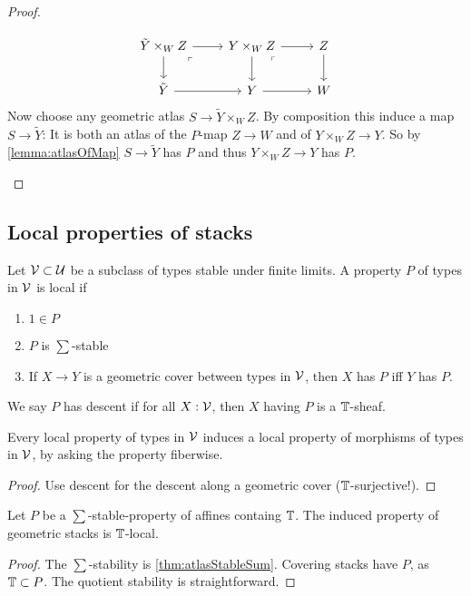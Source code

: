 \begin{proof}
\begin{enumerate}
		\[\begin{tikzcd}
			{\tilde Y \times_W Z} & {Y \times_W Z} & Z \\
			{\tilde Y} & Y & W
			\arrow[from=1-1, to=1-2]
			\arrow[from=1-1, to=2-1]
			\arrow["\ulcorner"{anchor=center, pos=0.125}, draw=none, from=1-1, to=2-2]
			\arrow[from=1-2, to=1-3]
			\arrow[from=1-2, to=2-2]
			\arrow["\ulcorner"{anchor=center, pos=0.125}, draw=none, from=1-2, to=2-3]
			\arrow[from=1-3, to=2-3]
			\arrow[from=2-1, to=2-2]
			\arrow[from=2-2, to=2-3]
		\end{tikzcd}\]
		Now choose any geometric atlas $S \to \tilde Y \times_W Z$. By composition this induce a map $S \to \tilde Y$: 
		It is both an atlas of the $P$-map $Z \to W$ and of $ Y\times_W Z \to Y$. So by \ref{lemma:atlasOfMap} $S \to \tilde Y$ has $P$ and thus $Y \times_W Z \to Y$ has $P$. 
		
	\end{enumerate}
\end{proof}
\subsection{Local properties of stacks}
\begin{definition}
	Let $\mathcal{V} \subset \mathcal{U}$ be a subclass of types stable under finite limits. A property $P$ of types in $\mathcal{V}$ is local if 
	\begin{enumerate}
		\item $1 \in P$
		\item $P$ is $\sum$-stable
		\item If $X \to Y$ is a geometric cover between types in $\mathcal{V}$, then $X$ has $P$ iff $Y$ has $P$.
		
	\end{enumerate}
	We say $P$ has descent if for all $X : \mathcal{V}$, then $X$ having $P$ is a $\mathbb{T}$-sheaf.
\end{definition}
\begin{lemma}
	Every local property of types in $\mathcal{V}$ induces a local property of morphisms of types in $\mathcal{V}$, by asking the property fiberwise.
\end{lemma}
\begin{proof}
	Use descent for the descent along a geometric cover ($\mathbb{T}$-surjective!).
\end{proof}
\begin{lemma}
	Let $P$ be a $\sum$-stable-property of affines containg $\mathbb{T}$. The induced property of geometric stacks is $\mathbb{T}$-local.
\end{lemma}
\begin{proof}
	The $\sum$-stability is \ref{thm:atlasStableSum}. Covering stacks have $P$, as $\mathbb{T} \subset P$. The quotient stability is straightforward.
\end{proof}
